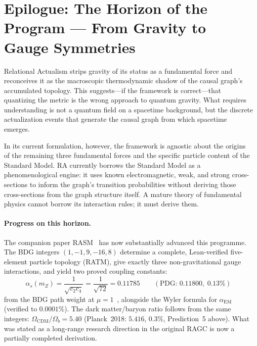 \documentclass[11pt,a4paper]{article}
\theoremstyle{plain}
\theoremstyle{definition}
\theoremstyle{remark}
\begin{document}

\section*{Epilogue: The Horizon of the Program --- From Gravity to Gauge Symmetries}
\label{sec:epilogue}

Relational Actualism strips gravity of its status as a fundamental force and
reconceives it as the macroscopic thermodynamic shadow of the causal graph's
accumulated topology. This suggests---if the framework is correct---that
quantizing the metric is the wrong approach to quantum gravity. What requires
understanding is not a quantum field on a spacetime background, but the discrete
actualization events that generate the causal graph from which spacetime emerges.

In its current formulation, however, the framework is agnostic about the origins
of the remaining three fundamental forces and the specific particle content of the
Standard Model. RA currently borrows the Standard Model as a phenomenological
engine: it uses known electromagnetic, weak, and strong cross-sections to inform
the graph's transition probabilities without deriving those cross-sections from
the graph structure itself. A mature theory of fundamental physics cannot borrow
its interaction rules; it must derive them.

\paragraph{Progress on this horizon.}
The companion paper RASM~\citep{Sandeman2026RASM} has now substantially
advanced this programme.  The BDG integers $(1,-1,9,-16,8)$ determine a
complete, Lean-verified five-element particle topology (RATM), give exactly
three non-gravitational gauge interactions, and yield two proved coupling
constants:
\begin{equation}
  \alpha_s(m_Z) = \frac{1}{\sqrt{c_2 c_4}} = \frac{1}{\sqrt{72}} = 0.11785
  \qquad (\text{PDG: } 0.11800,\; 0.13\%)
\end{equation}
from the BDG path weight at $\mu=1$~\citep{Sandeman2026BDG}, alongside the
Wyler formula for $\alpha_{\mathrm{EM}}$ (verified to $0.0001\%$).  The
dark matter/baryon ratio follows from the same integers:
$\Omega_{\mathrm{CDM}}/\Omega_b = 5.40$ (Planck~2018: $5.416$, $0.3\%$,
Prediction~5 above).  What was stated as a long-range research direction in
the original RAGC is now a partially completed derivation.
\end{document}
